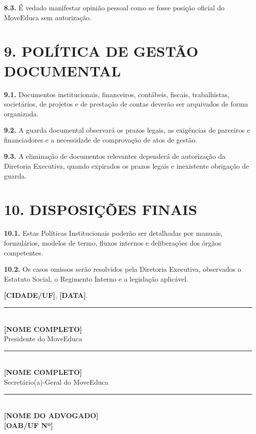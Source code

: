 \documentclass[11pt,a4paper]{article}
\begin{document}
\textbf{8.3.} É vedado manifestar opinião pessoal como se fosse posição oficial do MoveEduca sem autorização.

\section*{9. POLÍTICA DE GESTÃO DOCUMENTAL}

\textbf{9.1.} Documentos institucionais, financeiros, contábeis, fiscais, trabalhistas, societários, de projetos e de prestação de contas deverão ser arquivados de forma organizada.

\textbf{9.2.} A guarda documental observará os prazos legais, as exigências de parceiros e financiadores e a necessidade de comprovação de atos de gestão.

\textbf{9.3.} A eliminação de documentos relevantes dependerá de autorização da Diretoria Executiva, quando expirados os prazos legais e inexistente obrigação de guarda.

\section*{10. DISPOSIÇÕES FINAIS}

\textbf{10.1.} Estas Políticas Institucionais poderão ser detalhadas por manuais, formulários, modelos de termo, fluxos internos e deliberações dos órgãos competentes.

\textbf{10.2.} Os casos omissos serão resolvidos pela Diretoria Executiva, observados o Estatuto Social, o Regimento Interno e a legislação aplicável.

\vspace{2cm}
\begin{center}
\textbf{[CIDADE/UF]}, \textbf{[DATA]}.

\vspace{2cm}
\rule{8cm}{0.4pt}\\
\textbf{[NOME COMPLETO]}\\
Presidente do MoveEduca

\vspace{1.5cm}
\rule{8cm}{0.4pt}\\
\textbf{[NOME COMPLETO]}\\
Secretário(a)-Geral do MoveEduca

\vspace{1.5cm}
\rule{8cm}{0.4pt}\\
\textbf{[NOME DO ADVOGADO]}\\
\textbf{[OAB/UF Nº]}
\end{center}
\end{document}
